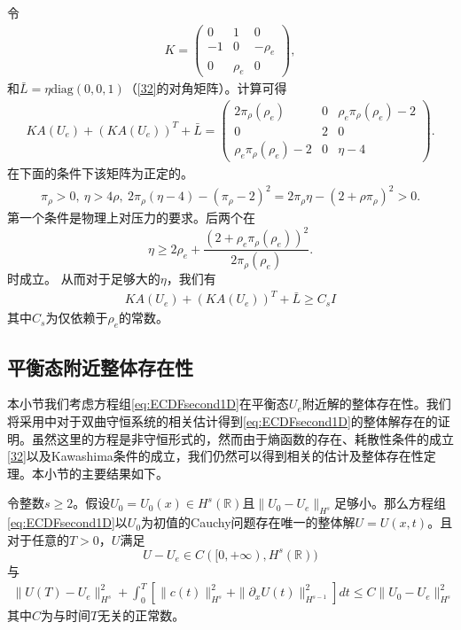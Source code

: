令
\begin{eqnarray}\label{33}
K=\left( \begin{array}{ccc}
	0 & 1 & 0 \\
	-1 & 0 & -\rho_e \\
	0 & \rho_e & 0
	\end{array} \right),
\end{eqnarray}
和$\bar{L} = \eta\mbox{diag}(0, 0, 1)$（\eqref{32}的对角矩阵）。计算可得
\begin{eqnarray*}
K A(U_e) + (K A(U_e))^T + \bar{L} =
	\left( \begin{array}{ccc}
	2 \pi_\rho(\rho_e) & 0 & \rho_e \pi_\rho(\rho_e) -2  \\
	0 & 2 & 0 \\
	\rho_e \pi_\rho(\rho_e) - 2 & 0 & \eta -4 	
	\end{array} \right).
\end{eqnarray*}
在下面的条件下该矩阵为正定的。
\begin{eqnarray*}
\pi_\rho  > 0, \ \eta > 4 \rho, \ 2\pi_\rho(\eta - 4)-(\pi_{\rho}-2)^2 = 2 \pi_\rho \eta  - (2 +  \rho \pi_\rho)^2 >0.
\end{eqnarray*}
第一个条件是物理上对压力的要求。后两个在
$$
\eta \ge 2 \rho_e +\frac{(2 + \rho_e \pi_\rho(\rho_e))^2}{2 \pi_\rho(\rho_e)}.
$$
时成立。
从而对于足够大的$\eta$，我们有
\begin{eqnarray}\label{35}
K A(U_e) + (K A(U_e))^T + \bar{L} \ge C_s I
\end{eqnarray}
其中$C_s$为仅依赖于$\rho_e$的常数。

\subsection{平衡态附近整体存在性}
本小节我们考虑方程组\eqref{eq:ECDFsecond1D}在平衡态$U_e$附近解的整体存在性。我们将采用\cite{yong2004entropy,kawashima2009decay}中对于双曲守恒系统的相关估计得到\eqref{eq:ECDFsecond1D}的整体解存在的证明。虽然这里的方程是非守恒形式的，然而由于熵函数的存在、耗散性条件的成立\eqref{32}以及Kawashima条件的成立，我们仍然可以得到相关的估计及整体存在性定理。本小节的主要结果如下。

\begin{theorem} \label{theoremglobal}
令整数$s \ge 2$。假设$U_0=U_0(x) \in H^s(\mathbb{R})$且$\|U_0 -U_e\|_{H^s}$足够小。那么方程组\eqref{eq:ECDFsecond1D}以$U_0$为初值的Cauchy问题存在唯一的整体解$U=U(x,t)$。且对于任意的$T>0$，$U$满足
$$
U-U_e \in C([0,+\infty),H^s(\mathbb{R}))
$$
与
\begin{eqnarray}\label{41}
\|U(T)-U_e\|^2_{H^s} + \int_0^T \left[ \|c(t)\|^2_{H^s} + \|\partial_x U(t)\|^2_{H^{s-1}} \right] dt \le C \|U_0 -U_e\|^2_{H^s}
\end{eqnarray}
其中$C$为与时间$T$无关的正常数。
\end{theorem}

